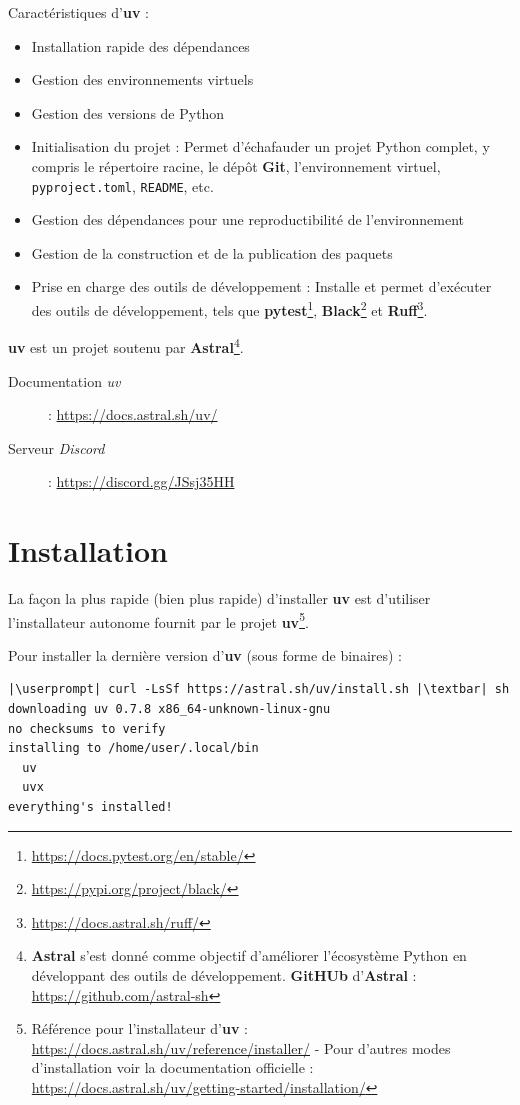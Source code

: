 Caractéristiques d'\textbf{uv} :
\begin{itemize}
    \item Installation rapide des dépendances
    \item Gestion des environnements virtuels
    \item Gestion des versions de Python
    \item Initialisation du projet : Permet d'échafauder un projet Python complet, y compris le répertoire racine, le dépôt \textbf{Git}, l'environnement virtuel, \texttt{pyproject.toml}, \texttt{README}, etc.
    \item Gestion des dépendances pour une reproductibilité de l'environnement
    \item Gestion de la construction et de la publication des paquets
    \item Prise en charge des outils de développement : Installe et permet d'exécuter des outils de développement, tels que \textbf{pytest}\footnote{\url{https://docs.pytest.org/en/stable/}}, \textbf{Black}\footnote{\url{https://pypi.org/project/black/}} et \textbf{Ruff}\footnote{\url{https://docs.astral.sh/ruff/}}.
\end{itemize}
\medskip

\textbf{uv} est un projet soutenu par \textbf{Astral}\footnote{\textbf{Astral} s'est donné comme objectif d'améliorer l'écosystème Python en développant des outils de développement. \textbf{GitHUb} d'{\textbf{Astral}} : \url{https://github.com/astral-sh}}.
\begin{description}
    \item[Documentation \textit{uv}] : \url{https://docs.astral.sh/uv/}
    \item[Serveur \textit{Discord}] : \url{https://discord.gg/JSsj35HH}
\end{description}

\section{Installation}
La façon la plus rapide (bien plus rapide) d'installer \textbf{uv} est d'utiliser l'installateur autonome fournit par le projet \textbf{uv}\footnote{Référence pour l'installateur d'\textbf{uv} : \url{https://docs.astral.sh/uv/reference/installer/} - Pour d'autres modes d'installation voir la documentation officielle : \url{https://docs.astral.sh/uv/getting-started/installation/}}.

Pour installer la dernière version d'\textbf{uv} (sous forme de binaires) :
\begin{lstlisting}[style=bash]
|\userprompt| curl -LsSf https://astral.sh/uv/install.sh |\textbar| sh
downloading uv 0.7.8 x86_64-unknown-linux-gnu
no checksums to verify
installing to /home/user/.local/bin
  uv
  uvx
everything's installed!
\end{lstlisting}

